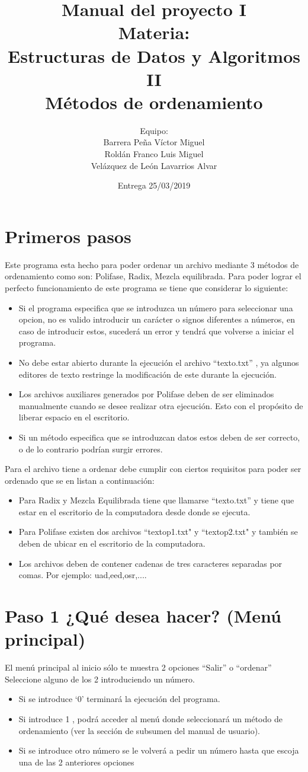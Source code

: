 \documentclass[12pt]{report}
\title{Manual del proyecto I \\ Materia: \\Estructuras de Datos y Algoritmos II\\ 
\large Métodos de ordenamiento}
\author{
	Equipo:\\
	Barrera Peña Víctor Miguel \\
	Roldán Franco Luis Miguel \\
	Velázquez de León Lavarrios Alvar 
}
\date{Entrega 25/03/2019}
\begin{document}
	\maketitle
	\chapter{Primeros pasos}
	Este programa  esta hecho para poder ordenar un archivo mediante 3 métodos de ordenamiento como son: Polifase, Radix, Mezcla equilibrada.
	Para poder lograr el perfecto funcionamiento de este programa se tiene que considerar lo siguiente:
	\begin{itemize}
		\item Si el programa especifica que se introduzca un número para seleccionar una opcion, no es valido introducir un carácter o signos diferentes a números, en caso de introducir estos, sucederá un error y tendrá que volverse a iniciar el programa.
		\item No debe estar abierto durante la ejecución el archivo ``texto.txt'' , ya algunos editores de texto restringe la modificación de este durante la ejecución.
		\item Los archivos auxiliares generados por Polifase deben de ser eliminados manualmente cuando se desee realizar otra ejecución.
		Esto con el propósito de liberar espacio en el escritorio.
		\item Si un método especifica que se introduzcan datos estos deben de ser correcto, o de lo contrario podrían surgir errores.
	\end{itemize}
	Para el archivo tiene a ordenar debe cumplir con ciertos requisitos para poder ser ordenado que se en listan a continuación:
	\begin{itemize}
		\item Para Radix y Mezcla Equilibrada tiene que llamarse ``texto.txt'' y tiene que estar en el escritorio de la computadora desde donde se ejecuta.
		\item Para Polifase existen dos archivos ``textop1.txt" y ``textop2.txt" y también se deben de ubicar en el escritorio de la computadora.
		\item Los archivos deben de contener cadenas de tres caracteres separadas por comas. Por ejemplo: {uad,eed,osr,...}.
	\end{itemize}
	
	\chapter{Paso 1 ¿Qué desea hacer? (Menú principal)}
	El menú principal al inicio sólo te muestra 2 opciones ``Salir'' o ``ordenar'' Seleccione alguno de los 2 introduciendo un número.
	\begin{itemize}
		\item Si se introduce `0' terminará la ejecución del programa.
		\item Si introduce 1 , podrá acceder al menú donde seleccionará un método de ordenamiento (ver la sección de subsumen del manual de usuario).
		\item Si se introduce otro número se le volverá a pedir un número hasta que escoja una de las 2 anteriores opciones
	\end{itemize}
\end{document}
